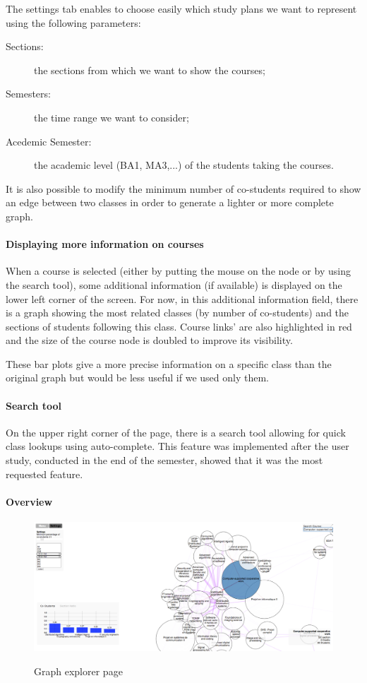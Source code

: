 The settings tab enables to choose easily which study plans we want to represent using the following parameters: 
\begin{description}
\item[Sections:] the sections from which we want to show the courses;
\item[Semesters:] the time range we want to consider;
\item[Acedemic Semester:] the academic level (BA1, MA3,...) of the students taking the courses.
\end{description}

It is also possible to modify the minimum number of co-students required to show an edge between two classes in order to generate a lighter or more complete graph. 

\paragraph{Displaying more information on courses}
When a course is selected (either by putting the mouse on the node or by using the search tool), some additional information (if available) is displayed on the lower left corner of the screen. For now, in this additional information field, there is a graph showing the most related classes (by number of co-students) and the sections of students following this class. Course links' are also highlighted in red and the size of the course node is doubled to improve its visibility.

These bar plots give a more precise information on a specific class than the original graph but would be less useful if we used only them. 

\paragraph{Search tool}
On the upper right corner of the page, there is a search tool allowing for quick class lookups using auto-complete. This feature was implemented after the user study, conducted in the end of the semester, showed that it was the most requested feature. 

\paragraph{Overview}
\begin{figure}[H]
\centering
\includegraphics[width=\textwidth]{images/view_orga_global}
\label{fig:global}
\caption{Graph explorer page}
\end{figure}


